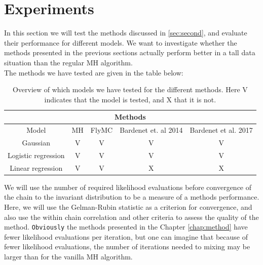 \chapter{Experiments}\label{chap:experiments}
In this section we will test the methods discussed in \ref{sec:second}, and evaluate their performance for different models. We want to investigate whether the methods presented in the previous sections actually perform better in a tall data situation than the regular MH algorithm.  \\
The methods we have tested are given in the table below: 

\begin{table}[ht]
    \centering
        \begin{tabular}{|c|c|c|c|c|}
    \hline
    \multicolumn{5}{|c|}{Methods} \\
    \hline
   Model & MH & FlyMC & Bardenet et. al 2014 & Bardenet et al. 2017\\ \hline\hline
        Gaussian & V & V & V &V \\
        Logistic regression &V &V &V &V  \\
        Linear regression &V & V& X& X \\ \hline
    \end{tabular}{}
    \caption{Overview of which models we have tested for the different methods. Here V indicates that the model is tested, and X that it is not.}
    \label{tab:experiment_overview}
\end{table}{}
We will use the number of required likelihood evaluations before convergence of the chain to the invariant distribution to be a measure of a methods performance.
Here, we will use the Gelman-Rubin statistic as a criterion for convergence, and also use the within chain correlation and other criteria to assess the quality of the method. 
\texttt{Obviously} the methods presented in the Chapter \ref{chap:method} have fewer likelihood evaluations per iteration, but one can imagine that because of fewer likelihood evaluations, the number of iterations needed to mixing may be larger than for the vanilla MH algorithm. 



